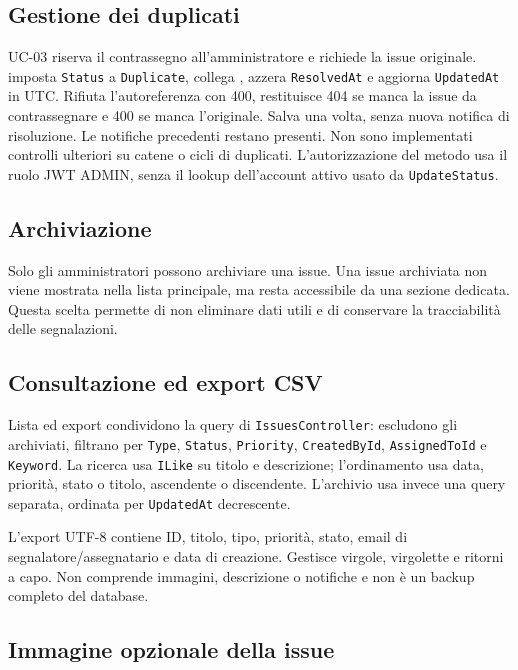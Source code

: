 \documentclass[12pt,a4paper]{article}
\begin{document}
\clearpage
\subsection{Gestione dei duplicati}

UC-03 riserva il contrassegno all'amministratore e richiede la issue originale.  imposta \texttt{Status} a \texttt{Duplicate}, collega , azzera \texttt{ResolvedAt} e aggiorna \texttt{UpdatedAt} in UTC. Rifiuta l'autoreferenza con 400, restituisce 404 se manca la issue da contrassegnare e 400 se manca l'originale. Salva una volta, senza nuova notifica di risoluzione. Le notifiche precedenti restano presenti. Non sono implementati controlli ulteriori su catene o cicli di duplicati. L'autorizzazione del metodo usa il ruolo JWT ADMIN, senza il lookup dell'account attivo usato da \texttt{UpdateStatus}.

\subsection{Archiviazione}

Solo gli amministratori possono archiviare una issue. Una issue archiviata non viene mostrata nella lista principale, ma resta accessibile da una sezione dedicata. Questa scelta permette di non eliminare dati utili e di conservare la tracciabilità delle segnalazioni.

\subsection{Consultazione ed export CSV}

Lista ed export condividono la query di \texttt{IssuesController}: escludono gli archiviati, filtrano per \texttt{Type}, \texttt{Status}, \texttt{Priority}, \texttt{CreatedById}, \texttt{AssignedToId} e \texttt{Keyword}. La ricerca usa \texttt{ILike} su titolo e descrizione; l'ordinamento usa data, priorità, stato o titolo, ascendente o discendente. L'archivio usa invece una query separata, ordinata per \texttt{UpdatedAt} decrescente.

L'export UTF-8 contiene ID, titolo, tipo, priorità, stato, email di segnalatore/assegnatario e data di creazione. Gestisce virgole, virgolette e ritorni a capo. Non comprende immagini, descrizione o notifiche e non è un backup completo del database.

\subsection{Immagine opzionale della issue}
\end{document}
